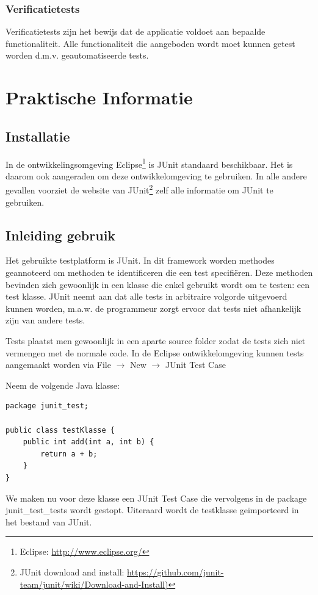 \documentclass{book}
\begin{document}
\subsection{Verificatietests}
Verificatietests zijn het bewijs dat de applicatie voldoet aan bepaalde functionaliteit. 
Alle functionaliteit die aangeboden wordt moet kunnen getest worden d.m.v. geautomatiseerde tests.

\chapter{Praktische Informatie}
\section{Installatie}
In de ontwikkelingsomgeving Eclipse\footnote{Eclipse: \url{http://www.eclipse.org/}} is JUnit standaard beschikbaar. Het is daarom ook aangeraden om deze ontwikkelomgeving te gebruiken. In alle andere gevallen voorziet de website van JUnit\footnote{JUnit download and install: \url{https://github.com/junit-team/junit/wiki/Download-and-Install)}}  zelf alle informatie om JUnit te gebruiken.

\section{Inleiding gebruik}
Het gebruikte testplatform is JUnit. 
In dit framework worden methodes geannoteerd om methoden te identificeren die een test specifiëren. 
Deze methoden bevinden zich gewoonlijk in een klasse die enkel gebruikt wordt om te testen: een test klasse. 
JUnit neemt aan dat alle tests in arbitraire volgorde uitgevoerd kunnen worden, m.a.w. de programmeur zorgt ervoor dat tests niet afhankelijk zijn van andere tests. 

Tests plaatst men gewoonlijk in een aparte source folder zodat de tests zich niet vermengen met de normale code. 
In de Eclipse ontwikkelomgeving kunnen tests aangemaakt worden via File $\rightarrow$ New $\rightarrow$ JUnit Test Case

Neem de volgende Java klasse: 

\begin{lstlisting}
package junit_test;

public class testKlasse {
	public int add(int a, int b) {
		return a + b;
	}
}
\end{lstlisting}

We maken nu voor deze klasse een JUnit Test Case die vervolgens in de package junit\_test\_tests wordt gestopt. Uiteraard wordt de testklasse geïmporteerd in het bestand van JUnit. 
\end{document}
